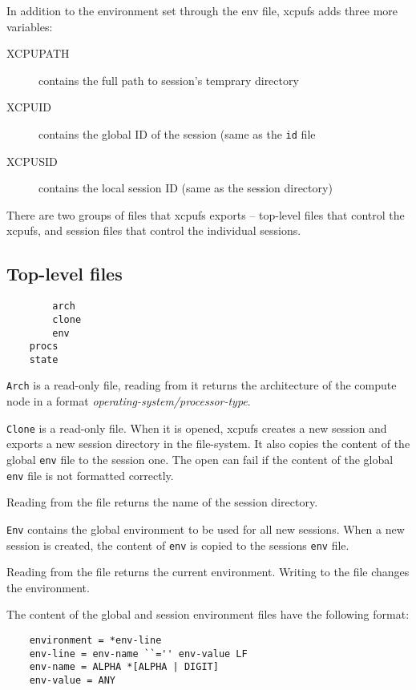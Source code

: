 \documentclass[draft]{article}
\begin{document}
In addition to the environment set through the env file, xcpufs adds three
more variables:

\begin{description}

\item[XCPUPATH] contains the full path to session's temprary directory
\item[XCPUID] contains the global ID of the session (same as the {\tt id} file
\item[XCPUSID] contains the local session ID (same as the session directory)

\end{description}

There are two groups of files that xcpufs exports -- top-level files that
control the xcpufs, and session files that control the individual sessions.

\subsection{Top-level files}

\begin{verbatim}
        arch
        clone
        env
	procs
	state
\end{verbatim}

\verb|Arch| is a read-only file, reading from it returns the architecture of
the compute node in a format {\sl operating-system/processor-type}.

\verb|Clone| is a read-only file. When it is opened, xcpufs creates a new
session and exports a new session directory in the file-system. It also
copies the content of the global \verb|env| file to the session one. The
open can fail if the content of the global \verb|env| file is not formatted
correctly. 

Reading from the file returns the name of the session directory. 

\verb|Env| contains the global environment to be used for all new sessions.
When a new session is created, the content of \verb|env| is copied to the
sessions \verb|env| file.

Reading from the file returns the current environment. Writing to the file
changes the environment. 

The content of the global and session environment files have the following
format:

\begin{verbatim}
	environment = *env-line
	env-line = env-name ``='' env-value LF
	env-name = ALPHA *[ALPHA | DIGIT]
	env-value = ANY
\end{verbatim}
\end{document}
